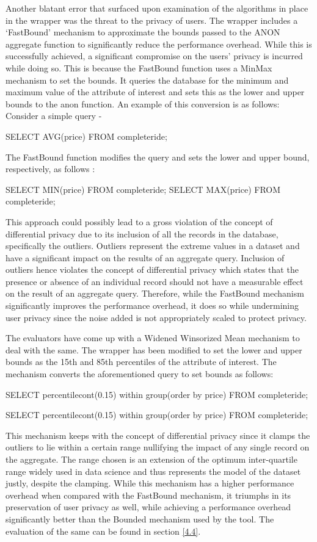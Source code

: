 \documentclass[acmsmall]{acmart}
\begin{document}
Another blatant error that surfaced upon examination of the algorithms in place in the wrapper was the threat to the privacy of users. The wrapper includes a ‘FastBound’ mechanism to approximate the bounds passed to the ANON aggregate function to significantly reduce the performance overhead. While this is successfully achieved, a significant compromise on the users’ privacy is incurred while doing so. This is because the FastBound function uses a MinMax mechanism to set the bounds. It queries the database for the minimum and maximum value of the attribute of interest and sets this as the lower and upper bounds to the anon function. An example of this conversion is as follows:
\newline
Consider a simple query -
\begin{center}
    SELECT AVG(price) FROM completeride;
\end{center}
The FastBound function modifies the query and sets the lower and upper bound, respectively,  as follows :
\begin{center}
    SELECT MIN(price) FROM completeride;
    SELECT MAX(price) FROM completeride;
\end{center}
This approach could possibly lead to a gross violation of the concept of differential privacy due to its inclusion of all the records in the database, specifically the outliers. Outliers represent the extreme values in a dataset and have a significant impact on the results of an aggregate query. Inclusion of outliers hence violates the concept of differential privacy which states that the presence or absence of an individual record should not have a measurable effect on the result of an aggregate query. Therefore, while the FastBound mechanism significantly improves the performance overhead, it does so while undermining user privacy since the noise added is not appropriately scaled to protect privacy.
 
The evaluators have come up with a Widened Winsorized Mean mechanism to deal with the same. The wrapper has been modified to set the lower and upper bounds as the 15th and 85th percentiles of the attribute of interest. The mechanism converts the aforementioned query to set bounds as follows: 
\begin{center}
    SELECT percentile\textunderscore cont(0.15) within group(order by price) FROM completeride;
\end{center}
\begin{center}
    SELECT percentile\textunderscore cont(0.15) within group(order by price) FROM completeride;
\end{center}
This mechanism keeps with the concept of differential privacy since it clamps the outliers to lie within a certain range nullifying the impact of any single record on the aggregate. The range chosen is an extension of the optimum inter-quartile range widely used in data science and thus represents the model of the dataset justly, despite the clamping. While this mechanism has a higher performance overhead when compared with the FastBound mechanism, it triumphs in its preservation of user privacy as well, while achieving a performance overhead significantly better than the Bounded mechanism used by the tool. The evaluation of the same can be found in section \ref{4.4}.
\end{document}
